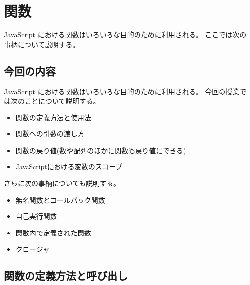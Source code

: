 \chapter{関数}
\ifText
JavaScript における関数はいろいろな目的のために利用される。
ここでは次の事柄について説明する。
\else
\section{今回の内容}
JavaScript における関数はいろいろな目的のために利用される。
今回の授業では次のことについて説明する。
\fi
\begin{itemize}
 \item 関数の定義方法と使用法
 \item 関数への引数の渡し方
 \item 関数の戻り値(数や配列のほかに関数も戻り値にできる)
 \item JavaScriptにおける変数のスコープ
\end{itemize}
さらに次の事柄についても説明する。
\begin{itemize}
 \item 無名関数とコールバック関数
 \item 自己実行関数
 \item 関数内で定義された関数
 \item クロージャ
\end{itemize}
\section{関数の定義方法と呼び出し}
